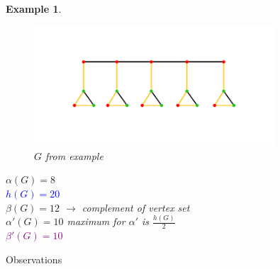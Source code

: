 \documentclass[notitlepage, 12pt]{article}
\newtheorem*{example}{Example}
\begin{document}
\begin{example}
    \begin{figure}[h]
      \includegraphics[width=0.8\textwidth]{first_example.pdf}
      \centering
      \caption{$G$ from example}
    \end{figure}

    \textcolor{BrickRed}{$\alpha(G) = 8$}\\
    \textcolor{blue}{$h(G) = 20$}\\
    \textcolor{OliveGreen}{$\beta(G) = 12$} $\rightarrow$ complement of vertex set\\
    \textcolor{Dandelion}{$\alpha'(G) = 10$} maximum for $\alpha'$ is $\frac{h(G)}{2}$\\
    \textcolor{purple}{$\beta'(G) = 10$}
\end{example}
\newpage
\Large{Observations} \normalsize
\end{document}
